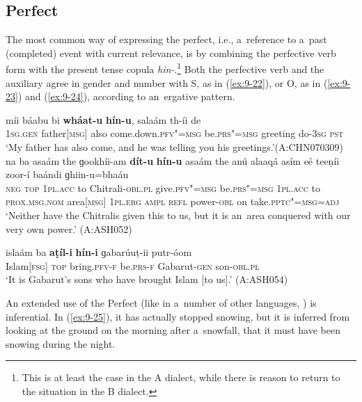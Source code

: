 \subsection{Perfect}
\label{subsec:9-1-7}

The most common way of expressing the perfect, i.e., a~reference to a~past (completed) event with current relevance, is by combining the perfective verb form with the present tense copula \textit{hin-}.\footnote{This is at least the case in the A dialect, while there is reason to return to the situation in the B dialect.} Both the perfective verb and the auxiliary agree in gender and number with S, as in (\ref{ex:9-22}), or O, as in (\ref{ex:9-23}) and (\ref{ex:9-24}), according to an~ergative pattern.

\begin{exe}
\ex
\label{ex:9-22}
\gll míi báabu bi \textbf{wháat-u} \textbf{hín-u}, salaám th-íi de\\
\textsc{1sg.gen} father\textsc{[msg]} also come.down.\textsc{pfv"=msg} be.\textsc{prs"=msg} greeting do-\textsc{3sg} \textsc{pst} \\
\glt `My father has also come, and he was telling you his greetings.'\newline (A:CHN070309)
\ex
\label{ex:9-23}
\gll na ba asaám the ɡookhíi-am \textbf{dít-u} \textbf{hín-u} asaám the anú alaaqá asím eé teeṇíi zoor-í baándi ɡhiin-u=bhaáu\\
\textsc{neg} \textsc{top} \textsc{1pl.acc} to Chitrali-\textsc{obl.pl} give.\textsc{pfv"=msg}  be.\textsc{prs"=msg } \textsc{1pl.acc} to \textsc{prox.msg.nom} area\textsc{[msg]} \textsc{1pl.erg} \textsc{ampl} \textsc{refl} power-\textsc{obl} on take.\textsc{pptc"=msg=adj}\\
\glt `Neither have the Chitralis given this to us, but it is an~area conquered with our very own power.' (A:ASH052)

\ex
\label{ex:9-24}
\gll islaám ba \textbf{aṭíl-i} \textbf{hín-i} ɡabarúuṭ-ii putr-óom \\
Islam\textsc{[fsg]} \textsc{top} bring.\textsc{pfv-f} be.\textsc{prs-f} Gabarut-\textsc{gen} son-\textsc{obl.pl} \\
\glt `It is Gabarut's sons who have brought Islam [to us].' (A:ASH054) 
\end{exe}

An extended use of the Perfect (like in a~number of other languages, \citealt[152]{dahl1985}) is inferential. In (\ref{ex:9-25}), it has actually stopped snowing, but it is inferred from looking at the ground on the morning after a~snowfall, that it must have been snowing during the night.

